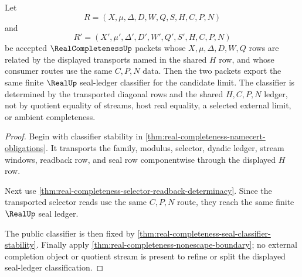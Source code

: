 \begin{theorem}
\label{thm:real-completeness-limit-uniqueness-classifier}
Let
$$
R=(X,\mu,\Delta,D,W,Q,S,H,C,P,N)
$$
and
$$
R'=(X',\mu',\Delta',D',W',Q',S',H,C,P,N)
$$
be accepted $\RealCompletenessUp$ packets whose $X,\mu,\Delta,D,W,Q$ rows are related by the displayed transports named in the shared $H$ row, and whose consumer routes use the same $C,P,N$ data. Then the two packets export the same finite $\RealUp$ seal-ledger classifier for the candidate limit. The classifier is determined by the transported diagonal rows and the shared $H,C,P,N$ ledger, not by quotient equality of streams, host real equality, a selected external limit, or ambient completeness.
\end{theorem}
\begin{proof}
Begin with classifier stability in \autoref{thm:real-completeness-namecert-obligations}. It transports the family, modulus, selector, dyadic ledger, stream windows, readback row, and seal row componentwise through the displayed $H$ row.

Next use \autoref{thm:real-completeness-selector-readback-determinacy}. Since the transported selector reads use the same $C,P,N$ route, they reach the same finite $\RealUp$ seal ledger.

The public classifier is then fixed by \autoref{thm:real-completeness-seal-classifier-stability}. Finally apply \autoref{thm:real-completeness-nonescape-boundary}; no external completion object or quotient stream is present to refine or split the displayed seal-ledger classification.
\end{proof}

